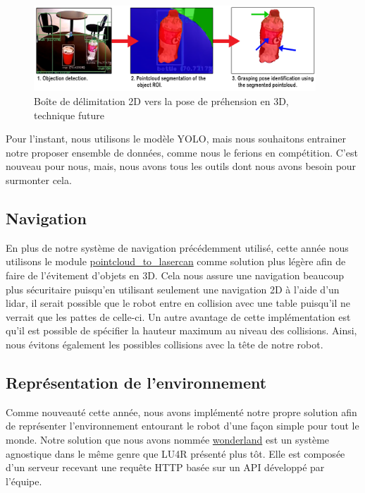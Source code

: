 \documentclass[runningheads,a4paper]{llncs}
\begin{document}
\begin{figure}
  \centering
  \includegraphics[width=300pt]{images/frame_to_box2.png}
  \caption{Boîte de délimitation 2D vers la pose de préhension en 3D, technique future}
\end{figure}

Pour l'instant, nous utilisons le modèle YOLO, mais nous souhaitons entrainer notre proposer ensemble de données, comme nous le ferions en compétition. C'est nouveau pour nous, mais, nous avons tous les outils dont nous avons besoin pour surmonter cela. \\

\subsection{Navigation}
En plus de notre système de navigation précédemment utilisé, cette année nous utilisons le module \href{http://wiki.ros.org/pointcloud_to_laserscan}{pointcloud\_to\_lasercan} comme solution plus légère afin de faire de l'évitement d'objets en 3D. Cela nous assure une navigation beaucoup plus sécuritaire puisqu'en utilisant seulement une navigation 2D à l'aide d'un lidar, il serait possible que le robot entre en collision avec une table puisqu'il ne verrait que les pattes de celle-ci. Un autre avantage de cette implémentation est qu'il est possible de spécifier la hauteur maximum au niveau des collisions. Ainsi, nous évitons également les possibles collisions avec la tête de notre robot. \\

\subsection{Représentation de l'environnement}
Comme nouveauté cette année, nous avons implémenté notre propre solution afin de représenter l'environnement entourant le robot d'une façon simple pour tout le monde. Notre solution que nous avons nommée \href{http://github.com/walkingmachine/wonderland}{wonderland} est un système agnostique dans le même genre que LU4R présenté plus tôt. Elle est composée d'un serveur recevant une requête HTTP basée sur un API développé par l'équipe.\\
\end{document}
